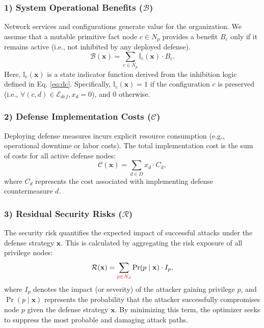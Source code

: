 \documentclass[conference]{IEEEtran}
\theoremstyle{definition} %
\theoremstyle{plain} %
\begin{document}
\subsubsection*{1) System Operational Benefits ($\mathcal{B}$)}
Network services and configurations generate value for the organization. We assume that a mutable primitive fact node $c \in N_p$ provides a benefit $B_c$ only if it remains active (i.e., not inhibited by any deployed defense).
\begin{equation}
    \mathcal{B}(\mathbf{x}) = \sum_{c \in N_p} \mathbb{I}_c(\mathbf{x}) \cdot B_c.
\end{equation}
Here, $\mathbb{I}_c(\mathbf{x})$ is a state indicator function derived from the inhibition logic defined in Eq. \eqref{eq:dc}. Specifically, $\mathbb{I}_c(\mathbf{x}) = 1$ if the configuration $c$ is preserved (i.e., $\forall (c, d)\in \mathcal{E}_{def}, x_d = 0$), and 0 otherwise.

\subsubsection*{2) Defense Implementation Costs ($\mathcal{C}$)}
Deploying defense measures incurs explicit resource consumption (e.g., operational downtime or labor costs). The total implementation cost is the sum of costs for all active defense nodes:
\begin{equation}
    \mathcal{C}(\mathbf{x}) = \sum_{d \in D} x_d \cdot C_d,
\end{equation}
where $C_d$ represents the cost associated with implementing defense countermeasure $d$.

\subsubsection*{3) Residual Security Risks ($\mathcal{R}$)}
The security risk quantifies the expected impact of successful attacks under the defense strategy $\mathbf{x}$. This is calculated by aggregating the risk exposure of all privilege nodes:
\begin{equation}
    \mathcal{R}(\mathbf{x}) = \sum_{\textcolor{red}{p \in N_d}} \Pr(p \mid \mathbf{x}) \cdot I_p,
\end{equation}
where $I_p$ denotes the impact (or severity) of the attacker gaining privilege $p$, and $\Pr(p \mid \mathbf{x})$ represents the probability that the attacker successfully compromises node $p$ given the defense strategy $\mathbf{x}$. By minimizing this term, the optimizer seeks to suppress the most probable and damaging attack paths.
\end{document}

